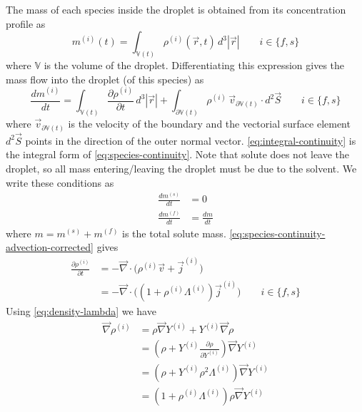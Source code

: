 \documentclass[12pt]{report}
\begin{document}
The mass of each species inside the droplet is obtained from its concentration profile as
\begin{equation}
  m^{(i)}(t) = \int_{\mathbb{V}(t)} \rho^{(i)}(\vec{r},t) \, d^3|\vec{r}|
  \qquad i \in \{f,s\}
\end{equation}
where $\mathbb{V}$ is the volume of the droplet.
Differentiating this expression gives the mass flow into the droplet (of this species) as
\begin{equation}\label{eq:integral-continuity}
  \frac{d m^{(i)}}{dt} =
  \int_{\mathbb{V}(t)} \frac{\partial \rho^{(i)}}{\partial t} \, d^3|\vec{r}| +
  \int_{\partial \mathbb{V}(t)} \rho^{(i)} \, \vec{v}_{\partial \mathbb{V}(t)} \cdot d^2\vec{S}
  \qquad i \in \{f,s\}
\end{equation}
where $\vec{v}_{\partial \mathbb{V}(t)}$ is the velocity of the boundary and the vectorial surface element $d^2\vec{S}$ points in the direction of the outer normal vector.
\eqref{eq:integral-continuity} is the integral form of \eqref{eq:species-continuity}.
Note that solute does not leave the droplet, so all mass entering/leaving the droplet must be due to the solvent.
We write these conditions as
\begin{subequations}
  \begin{align}
    \frac{d m^{(s)}}{dt} &= 0 \\
    \frac{d m^{(f)}}{dt} &= \frac{d m}{dt}
  \end{align}
\end{subequations}
where $m = m^{(s)} + m^{(f)}$ is the total solute mass.
\eqref{eq:species-continuity-advection-corrected} gives
\begin{equation}\label{eq:species-evolution-current}
  \begin{aligned}
    \frac{\partial \rho^{(i)}}{\partial t} &=
    - \vec{\nabla} \cdot \Big(
    \rho^{(i)} \vec{v} + \vec{j}^{(i)}
    \Big)
    \\
    &=
    - \vec{\nabla} \cdot \Big(
    (1 + \rho^{(i)} \Lambda^{(i)}) \vec{j}^{(i)}
    \Big)
    \qquad i \in \{f,s\}
  \end{aligned}
\end{equation}
Using \eqref{eq:density-lambda} we have
\begin{equation*}
  \begin{aligned}
    \vec{\nabla} \rho^{(i)} &=
    \rho \vec{\nabla} Y^{(i)} +
    Y^{(i)} \vec{\nabla} \rho \\
    &=
    \left(
    \rho + Y^{(i)} \frac{\partial \rho}{\partial Y^{(i)}}
    \right)
    \vec{\nabla} Y^{(i)}
    \\
    &=
    \left(
    \rho +
    Y^{(i)} \rho^2 \Lambda^{(i)}
    \right)
    \vec{\nabla} Y^{(i)} \\
    &=
    \left(
    1 +
    \rho^{(i)} \Lambda^{(i)}
    \right)
    \rho
    \vec{\nabla} Y^{(i)}
  \end{aligned}
\end{equation*}
\end{document}
